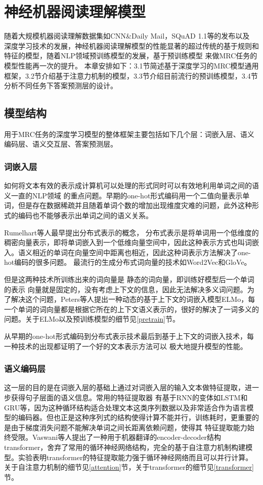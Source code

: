 \documentclass{article}
\newcommand{\upcite}[1]{\textsuperscript{\textsuperscript{\cite{#1}}}}
\begin{document}
																																	



\section{神经机器阅读理解模型}
随着大规模机器阅读理解数据集如CNN\&Daily Mail\upcite{CNNDailyMail}，SQuAD 1.1\upcite{SQuAD1}等的发布以及
深度学习技术的发展，神经机器阅读理解模型的性能显著的超过传统的基于规则和特征的模型，随着NLP领域预训练模型的发展，基于预训练模型
来做MRC任务的模型性能再一次的提升。
本章安排如下：3.1节简述基于深度学习的MRC模型通用框架，3.2节介绍基于注意力机制的模型，3.3节介绍目前流行的预训练模型，3.4节分析不同任务下答案预测层的设计。
\subsection{模型结构}
用于MRC任务的深度学习模型的整体框架主要包括如下几个层：词嵌入层、语义编码层、语义交互层、答案预测层。
\subsubsection{词嵌入层}
如何将文本有效的表示成计算机可以处理的形式同时可以有效地利用单词之间的语义一直的NLP领域
的重点问题。早期的one-hot形式编码用一个二值向量表示单词，但是存在数据稀疏并且随着单词个数的增加出现维度灾难的问题，此外这种形式的编码也不能够表示出单词之间的语义关系。

Rumelhart等人\upcite{Rumelhart}最早提出分布式表示的概念，
分布式表示是将单词用一个低维度的稠密向量表示，即将单词嵌入到一个低维向量空间中，因此这种表示方式也叫词嵌入。语义相近的单词在向量空间中距离也相近，因此这种词表示方法解决了one-hot编码的很多问题。
最流行的生成分布式词向量的技术如Word2Vec\upcite{word2vec}和GloVe\upcite{GloVe}。

但是这两种技术所训练出来的词向量是
静态的词向量，即训练好模型后一个单词的表示
向量就是固定的，没有考虑上下文的信息，因此无法解决多义词问题。为了解决这个问题，Peters等人\cite{ELMo}提出一种动态的基于上下文的词嵌入模型ELMo，每一个单词的词向量都是根据它所在的上下文语义表示的，很好的解决了一词多义的问题。关于ELMo以及预训练模型的细节见\ref{pretrain}节。

从早期的one-hot形式编码到分布式表示技术最后到基于上下文的词嵌入技术，每一种技术的出现都证明了一个好的文本表示方法可以
极大地提升模型的性能。
\subsubsection{语义编码层}
这一层的目的是在词嵌入层的基础上通过对词嵌入层的输入文本做特征提取，进一步获得句子层面的语义信息。常用的特征提取器
有基于RNN的变体如LSTM\upcite{LSTM}和GRU\upcite{GRU}等，因为这种循环结构适合处理文本这类序列数据以及非常适合作为语言模型的编码器。但也正是这种序列式的结构使得计算不能并行，训练耗时，更重要的是由于梯度消失问题不能解决单词之间长距离依赖问题，使得其
特征提取能力始终受限。Vaswani等人\upcite{Transformer}提出了一种用于机器翻译的encoder-decoder结构transformer，舍弃了常用的循环神经网络结构，完全的基于自注意力机制构建模型。实验表明transformer的特征提取能力强于循环神经网络而且可以并行计算。关于自注意力机制的细节见\ref{attention}节，关于transformer的细节见\ref{transformer}节。
\end{document}
